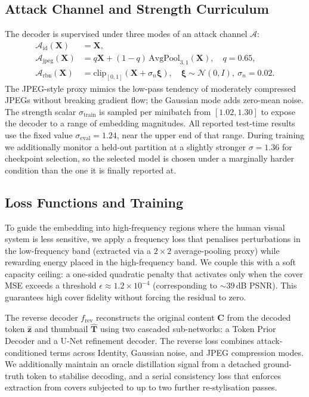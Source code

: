 \documentclass[conference]{IEEEtran}
\begin{document}
\subsection{Attack Channel and Strength Curriculum}
\label{sec:attack}
The decoder is supervised under three modes of an attack channel $\mathcal{A}$:
\begin{align*}
    \mathcal{A}_{\text{id}}(\mathbf{X}) &= \mathbf{X}, \\
    \mathcal{A}_{\text{jpeg}}(\mathbf{X}) &= q\mathbf{X}+(1-q)\,\mathrm{AvgPool}_{3,1}(\mathbf{X}),\quad q=0.65, \\
    \mathcal{A}_{\text{rbn}}(\mathbf{X}) &= \mathrm{clip}_{[0,1]}(\mathbf{X}+\sigma_{n}\boldsymbol{\xi}),\quad \boldsymbol{\xi}\!\sim\!\mathcal{N}(0,I),\ \sigma_{n}=0.02.
\end{align*}
The JPEG-style proxy mimics the low-pass tendency of moderately compressed JPEGs without breaking gradient flow; the Gaussian mode adds zero-mean noise. The strength scalar $\sigma_{\text{train}}$ is sampled per minibatch from $[1.02,1.30]$ to expose the decoder to a range of embedding magnitudes. All reported test-time results use the fixed value $\sigma_{\text{eval}}=1.24$, near the upper end of that range. During training we additionally monitor a held-out partition at a slightly stronger $\sigma=1.36$ for checkpoint selection, so the selected model is chosen under a marginally harder condition than the one it is finally reported at.

\subsection{Loss Functions and Training}
\label{sec:training}
To guide the embedding into high-frequency regions where the human visual system is less sensitive, we apply a frequency loss that penalises perturbations in the low-frequency band (extracted via a $2\!\times\!2$ average-pooling proxy) while rewarding energy placed in the high-frequency band. We couple this with a soft capacity ceiling: a one-sided quadratic penalty that activates only when the cover MSE exceeds a threshold $\epsilon \approx 1.2\!\times\!10^{-4}$ (corresponding to $\sim\!39$\,dB PSNR). This guarantees high cover fidelity without forcing the residual to zero.

The reverse decoder $f_{\text{rev}}$ reconstructs the original content $\mathbf{C}$ from the decoded token $\hat{\mathbf{z}}$ and thumbnail $\hat{\mathbf{T}}$ using two cascaded sub-networks: a Token Prior Decoder and a U-Net refinement decoder. The reverse loss combines attack-conditioned terms across Identity, Gaussian noise, and JPEG compression modes. We additionally maintain an oracle distillation signal from a detached ground-truth token to stabilise decoding, and a serial consistency loss that enforces extraction from covers subjected to up to two further re-stylisation passes.
\end{document}
